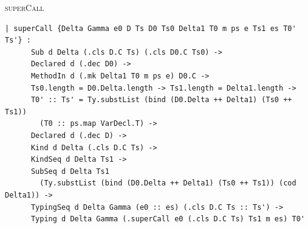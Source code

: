 \begin{cmp}{\textsc{superCall}}
\begin{paperside}
\end{paperside}
\begin{leanside}
\begin{lstlisting}[style=leanside]
  | superCall {Delta Gamma e0 D Ts D0 Ts0 Delta1 T0 m ps e Ts1 es T0' Ts'} :
      Sub d Delta (.cls D.C Ts) (.cls D0.C Ts0) ->
      Declared d (.dec D0) ->
      MethodIn d (.mk Delta1 T0 m ps e) D0.C ->
      Ts0.length = D0.Delta.length -> Ts1.length = Delta1.length ->
      T0' :: Ts' = Ty.substList (bind (D0.Delta ++ Delta1) (Ts0 ++ Ts1))
        (T0 :: ps.map VarDecl.T) ->
      Declared d (.dec D) ->
      Kind d Delta (.cls D.C Ts) ->
      KindSeq d Delta Ts1 ->
      SubSeq d Delta Ts1
        (Ty.substList (bind (D0.Delta ++ Delta1) (Ts0 ++ Ts1)) (cod Delta1)) ->
      TypingSeq d Delta Gamma (e0 :: es) (.cls D.C Ts :: Ts') ->
      Typing d Delta Gamma (.superCall e0 (.cls D.C Ts) Ts1 m es) T0'
\end{lstlisting}
\end{leanside}
\end{cmp}

